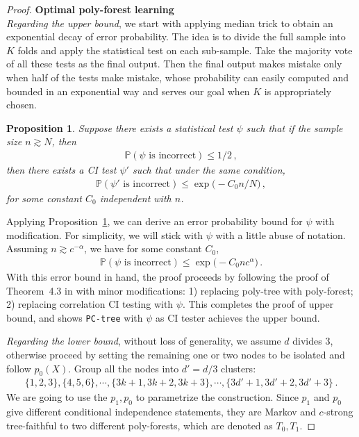 \documentclass{article}
\newtheorem{proposition}[theorem]{Proposition}
\theoremstyle{definition}
\theoremstyle{definition}
\theoremstyle{definition}
\theoremstyle{definition}
\theoremstyle{definition}
\theoremstyle{definition}
\theoremstyle{remark}
\theoremstyle{remark}
\newcommand{\prob}{\mathbb{P}}
\newcommand{\dd}{d}
\begin{document}
\begin{proof}
    \bigskip
    \noindent
    \textbf{Optimal poly-forest learning} \\
    \emph{Regarding the upper bound}, we start with applying median trick \citep{motwani1995randomized} to obtain an exponential decay of error probability. 
    The idea is to divide the full sample into $K$ folds and apply the statistical test on each sub-sample. Take the majority vote of all these tests as the final output. Then the final output makes mistake only when half of the tests make mistake, whose probability can easily computed and bounded in an exponential way and serves our goal when $K$ is appropriately chosen.
    \begin{proposition}\label{prop:median}
        Suppose there exists a statistical test $\psi$ such that if the sample size $n\gtrsim N$, then
        \begin{align*}
            \prob(\psi\text{ is incorrect}) \le 1/2\,,
        \end{align*}
        then there exists a CI test $\psi'$ such that under the same condition,
        \begin{align*}
            \prob(\psi'\text{ is incorrect}) \le \exp\Big( - C_0 n/N\Big)\,,
        \end{align*}
        for some constant $C_0$ independent with $n$.
    \end{proposition}
    \noindent
    Applying Proposition~\ref{prop:median}, we can derive an error probability bound for $\psi$ with modification. For simplicity, we will stick with $\psi$ with a little abuse of notation. Assuming $n\gtrsim c^{-\alpha}$, we have for some constant $C_0$,
    \begin{align*}
        \prob(\psi\text{ is incorrect}) \le \exp\Big( - C_0 n c^\alpha\Big) \,.
    \end{align*}
    With this error bound in hand, the proof proceeds by following the proof of Theorem~4.3 in \citet{wang2024optimal} with minor modifications: 1) replacing poly-tree with poly-forest; 2) replacing correlation CI testing with $\psi$.
    This completes the proof of upper bound, and shows \texttt{PC-tree} with $\psi$ as CI tester achieves the upper bound.
    
    \bigskip
    \noindent
    \emph{Regarding the lower bound}, without loss of generality, we assume $\dd$ divides $3$, otherwise proceed by setting the remaining one or two nodes to be isolated and follow $p_0(X)$.
    Group all the nodes into $\dd'=\dd/3$ clusters:
    \begin{align*}
        \{1,2,3\},\{4,5,6\},\cdots,\{3k+1,3k+2,3k+3\},\cdots, \{3\dd'+1,3\dd'+2,3\dd'+3\} \,.
    \end{align*}
    We are going to use the $p_1,p_0$ to parametrize the construction.
    Since $p_1$ and $p_0$ give different conditional independence statements, they are Markov and $c$-strong tree-faithful to two different poly-forests, which are denoted as $T_0,T_1$.
    

\end{proof}
\end{document}
